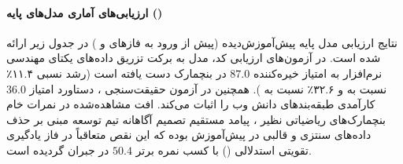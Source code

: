 \paragraph*{ارزیابی‌های آماری مدل‌های پایه ()}
نتایج ارزیابی مدل پایه پیش‌آموزش‌دیده  (پیش از ورود به فازهای  و ) در جدول زیر ارائه شده است. در آزمون‌های ارزیابی کد، مدل به برکت تزریق داده‌های یکتای مهندسی نرم‌افزار به امتیاز خیره‌کننده \textbf{$87.0$} در بنچمارک  دست یافته است (رشد نسبی ۱۱.۴٪ نسبت به  و ۳۲.۶٪ نسبت به ). همچنین در آزمون حقیقت‌سنجی ، دستاورد امتیاز \textbf{$36.0$} کارآمدی طبقه‌بندهای دانش وب را اثبات می‌کند. افت مشاهده‌شده در نمرات خام بنچمارک‌های ریاضیاتی نظیر ، پیامد مستقیم تصمیم آگاهانه تیم توسعه مبنی بر حذف داده‌های سنتزی و قالبی در پیش‌آموزش بوده که این نقص متعاقباً در فاز یادگیری تقویتی استدلالی () با کسب نمره برتر $50.4$ در  جبران گردیده است.

